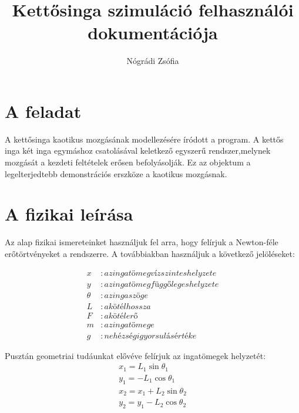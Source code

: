 \documentclass{article}
\title{Kettősinga szimuláció felhasználói dokumentációja}
\author{Nógrádi Zsófia}
\begin{document}
\maketitle
\pagebreak
\tableofcontents
\pagebreak

\section{A feladat}
A kettősinga kaotikus mozgásának modellezésére íródott a program. A kettős inga két inga egymáshoz csatolásával keletkező egyszerű rendszer,melynek mozgását a kezdeti feltételek erősen befolyásolják. Ez az objektum a legelterjedtebb demonstrációs erszköze a kaotikus mozgásnak.

\section{A fizikai leírása}
Az alap fizikai ismereteinket használjuk fel arra, hogy felírjuk a Newton-féle erőtörtvényeket a rendszerre. A továbbiakban használjuk a következő jelöléseket:

\begin{align*}
x &:  az ingatömeg vízszintes helyzete \\
y &: az ingatömeg függőleges helyzete \\
\theta &: az inga szöge \\
L &: a kötél hossza \\
F &: a kötélerő \\
m &: az ingatömege \\
g &: nehézségi gyorsulás értéke
\end{align*}

Pusztán geometriai tudáunkat elővéve felírjuk az ingatömegek helyzetét: 
\begin{gather*}
x_1=L_1 \sin \theta_1 \\
y_1= - L_1 \cos \theta_1 \\
x_2 = x_1 + L_2 \sin \theta_2 \\
y_2= y_1 - L_2 \cos \theta_2 \\
\end{gather*}
\end{document}

